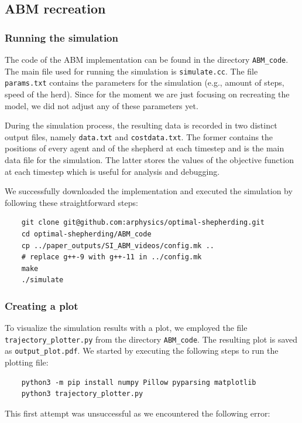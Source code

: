 \subsection{ABM recreation}

\subsubsection{Running the simulation}
The code of the ABM implementation can be found in the directory \texttt{ABM\_code}. The main file used for running the simulation is \texttt{simulate.cc}. The file \texttt{params.txt} contains the parameters for the simulation (e.g., amount of steps, speed of the herd). Since for the moment we are just focusing on recreating the model, we did not adjust any of these parameters yet. 

During the simulation process, the resulting data is recorded in two distinct output files, namely \texttt{data.txt} and \texttt{costdata.txt}. The former contains the positions of every agent and of the shepherd at each timestep and is the main data file for the simulation. The latter stores the values of the objective function at each timestep which is useful for analysis and debugging.

We successfully downloaded the implementation and executed the simulation by following these straightforward steps:

\begin{verbatim}
    git clone git@github.com:arphysics/optimal-shepherding.git
    cd optimal-shepherding/ABM_code
    cp ../paper_outputs/SI_ABM_videos/config.mk ..
    # replace g++-9 with g++-11 in ../config.mk
    make
    ./simulate
\end{verbatim}

\subsubsection{Creating a plot}
To visualize the simulation results with a plot, we employed the file \texttt{trajectory\_plotter.py} from the directory \texttt{ABM\_code}. The resulting plot is saved as \texttt{output\_plot.pdf}. We started by executing the following steps to run the plotting file:

\begin{verbatim}
    python3 -m pip install numpy Pillow pyparsing matplotlib
    python3 trajectory_plotter.py
\end{verbatim}

\noindent
This first attempt was unsuccessful as we encountered the following error:


